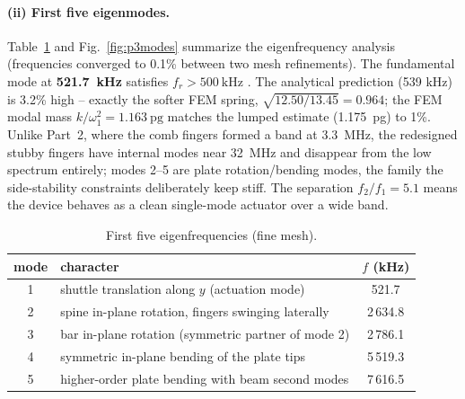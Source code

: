 \paragraph{(ii) First five eigenmodes.}
Table~\ref{tab:p3modes} and Fig.~\ref{fig:p3modes} summarize the
eigenfrequency analysis (frequencies converged to 0.1\% between two mesh
refinements). The fundamental mode at \textbf{\SI{521.7}{\kilo\hertz}}
satisfies $f_{r}>\SI{500}{\kilo\hertz}$ \checkmark. The analytical prediction
(539 kHz) is 3.2\% high -- exactly the softer FEM spring,
$\sqrt{12.50/13.45}=0.964$; the FEM modal mass $k/\omega_{1}^{2}=\SI{1.163}{\pico\gram}$
matches the lumped estimate (\SI{1.175}{\pico\gram}) to 1\%. Unlike Part~2,
where the comb fingers formed a band at \SI{3.3}{\mega\hertz}, the redesigned
stubby fingers have internal modes near \SI{32}{\mega\hertz} and disappear
from the low spectrum entirely; modes 2--5 are plate rotation/bending modes,
the family the side-stability constraints deliberately keep stiff. The
separation $f_{2}/f_{1}=5.1$ means the device behaves as a clean single-mode
actuator over a wide band.

\begin{table}[H]
\centering
\small
\caption{First five eigenfrequencies (fine mesh).}
\label{tab:p3modes}
\begin{tabular}{clc}
\toprule
mode & character & $f$ (\si{\kilo\hertz})\\
\midrule
1 & shuttle translation along $y$ (actuation mode)        & 521.7\\
2 & spine in-plane rotation, fingers swinging laterally   & 2\,634.8\\
3 & bar in-plane rotation (symmetric partner of mode 2)   & 2\,786.1\\
4 & symmetric in-plane bending of the plate tips          & 5\,519.3\\
5 & higher-order plate bending with beam second modes     & 7\,616.5\\
\bottomrule
\end{tabular}
\end{table}

